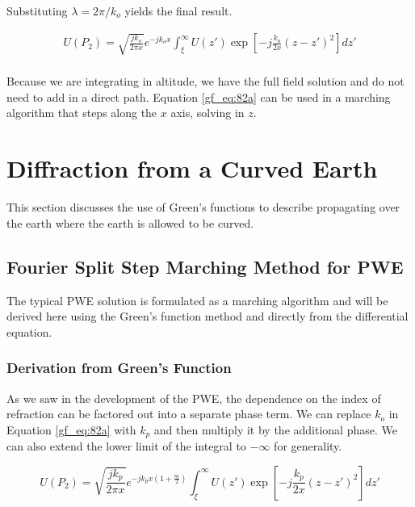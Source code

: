 \noindent Substituting $\lambda = 2\pi/k_o$ yields the final result.

\begin{equation}
\begin{aligned}
\boxed{U(P_2) =\sqrt{\frac{jk_o}{2\pi x}}e^{-jk_ox}\int_{\xi}^{\infty}U(z') \exp\left[-j \frac{k_o}{2x}\left(z-z'\right)^2 \right]dz'}\\
\end{aligned}
\label{gf_eq:82a}
\end{equation}
\renewcommand{\baselinestretch}{2} \small\normalsize

Because we are integrating in altitude, we have the full field solution and do not need to add in a direct path. Equation \ref{gf_eq:82a} can be used in a marching algorithm that steps along the $x$ axis, solving in $z$.

\section{Diffraction from a Curved Earth}
This section discusses the use of Green's functions to describe propagating over the earth where the earth is allowed to be curved.

\subsection{Fourier Split Step Marching Method for PWE}
The typical PWE solution is formulated as a marching algorithm and will be derived here using the Green's function method and directly from the differential equation. 

\subsubsection{Derivation from Green's Function}
As we saw in the development of the PWE, the dependence on the index of refraction can be factored out into a separate phase term. We can replace $k_o$ in Equation \ref{gf_eq:82a} with $k_p$ and then multiply it by the additional phase. We can also extend the lower limit of the integral to $-\infty$ for generality.

\begin{equation}
U(P_2) =\sqrt{\frac{jk_p}{2\pi x}}e^{-jk_px\left(1+\frac{m}{2}\right)}\int_{\xi}^{\infty}U(z') \exp\left[-j \frac{k_p}{2x}\left(z-z'\right)^2 \right]dz'
\label{gf_eq:301}
\end{equation}
\renewcommand{\baselinestretch}{2} \small\normalsize

